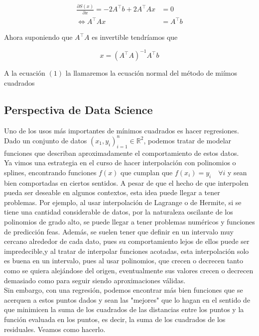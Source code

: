 \documentclass[12pt]{article}
\begin{document}
\begin{align*}
    \frac{\partial S(x)}{\partial x} = -2A^\top b + 2A^\top Ax&=0\\
  \iff  A^\top Ax& = A^\top b
\end{align*}

Ahora suponiendo que $A^\top A$ es invertible tendr\'iamos que

\begin{equation}
    x =(A^\top A)^{-1} A^\top b
\end{equation}
 
A la ecuaci\'on $(1)$ la llamaremos la ecuaci\'on normal del m\'etodo de mi\'imos cuadrados


\begin{center}
    \section{Perspectiva de Data Science}
\end{center}
Uno de los usos más importantes de mínimos cuadrados es hacer regresiones.\\ Dado un conjunto de datos $(x_1,y_i)_{i=1}^n \in \mathds{R}^2$, podemos tratar de modelar funciones que describan aproximadamente el comportamiento de estos datos.\\ Ya vimos una estrategia en el curso de hacer interpolación con polinomios o splines, encontrando funciones $f(x)$ que cumplan que $f(x_i) = y_i \quad \forall i$ y sean bien comportadas en ciertos sentidos. A pesar de que el hecho de que interpolen pueda ser deseable en algunos contextos, esta idea puede llegar  a tener problemas. Por ejemplo, al usar interpolación de Lagrange o de Hermite, si se tiene una cantidad considerable de datos, por la naturaleza oscilante de los polinomios de grado alto, se puede llegar a tener problemas numéricos y funciones de predicción feas. Además, se suelen tener que definir en un intervalo muy cercano alrededor de cada dato, pues su comportamiento lejos de ellos puede ser impredecible,y al tratar de interpolar funciones acotadas, esta interpolación solo es buena en un intervalo, pues al usar polinomios, que crecen o decrecen tanto como se quiera alejándose del origen, eventualmente sus valores crecen o decrecen demasiado como para seguir siendo aproximaciones válidas.\\
Sin embargo, con una regresión, podemos encontrar más bien funciones que se acerquen a estos puntos dados y sean las "mejores" que lo hagan en el sentido de que minimicen la suma de los cuadrados de las distancias entre los puntos y la función evaluada en los puntos, es decir, la suma de los cuadrados de los residuales. Veamos como hacerlo.\\
\end{document}
